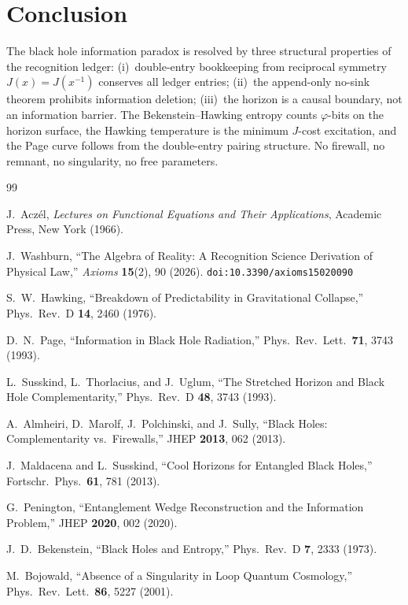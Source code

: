 \documentclass[12pt,a4paper]{article}
\theoremstyle{definition}
\theoremstyle{remark}
\begin{document}
\section{Conclusion}
\label{sec:conclusion}

The black hole information paradox is resolved by three structural
properties of the recognition ledger: (i)~double-entry bookkeeping
from reciprocal symmetry $J(x) = J(x^{-1})$ conserves all ledger
entries; (ii)~the append-only no-sink theorem prohibits information
deletion; (iii)~the horizon is a causal boundary, not an
information barrier.  The Bekenstein--Hawking entropy counts
$\varphi$-bits on the horizon surface, the Hawking temperature
is the minimum $J$-cost excitation, and the Page curve follows
from the double-entry pairing structure.  No firewall, no remnant,
no singularity, no free parameters.

\begin{thebibliography}{99}

J.~Acz\'el, \emph{Lectures on Functional Equations and Their Applications},
Academic Press, New York (1966).

J.~Washburn, ``The Algebra of Reality: A Recognition Science Derivation
of Physical Law,'' \emph{Axioms} \textbf{15}(2), 90 (2026).
\texttt{doi:10.3390/axioms15020090}

S.~W.~Hawking, ``Breakdown of Predictability in Gravitational
Collapse,'' Phys.\ Rev.\ D \textbf{14}, 2460 (1976).

D.~N.~Page, ``Information in Black Hole Radiation,'' Phys.\ Rev.\
Lett.\ \textbf{71}, 3743 (1993).

L.~Susskind, L.~Thorlacius, and J.~Uglum, ``The Stretched Horizon
and Black Hole Complementarity,'' Phys.\ Rev.\ D \textbf{48},
3743 (1993).

A.~Almheiri, D.~Marolf, J.~Polchinski, and J.~Sully, ``Black
Holes: Complementarity vs.\ Firewalls,'' JHEP \textbf{2013}, 062
(2013).

J.~Maldacena and L.~Susskind, ``Cool Horizons for Entangled Black
Holes,'' Fortschr.\ Phys.\ \textbf{61}, 781 (2013).

G.~Penington, ``Entanglement Wedge Reconstruction and the
Information Problem,'' JHEP \textbf{2020}, 002 (2020).

J.~D.~Bekenstein, ``Black Holes and Entropy,'' Phys.\ Rev.\ D
\textbf{7}, 2333 (1973).

M.~Bojowald, ``Absence of a Singularity in Loop Quantum
Cosmology,'' Phys.\ Rev.\ Lett.\ \textbf{86}, 5227 (2001).

\end{thebibliography}
\end{document}
